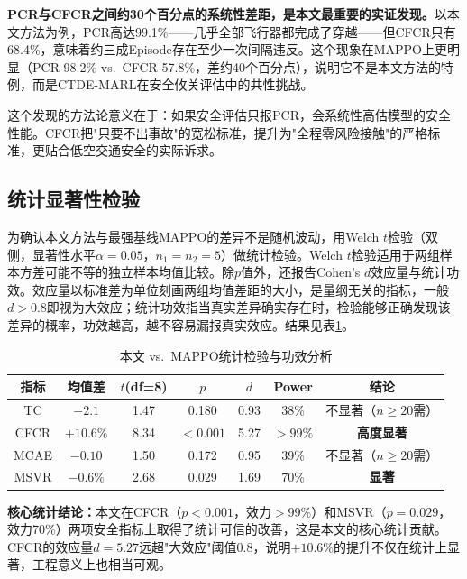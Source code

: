 \documentclass[12pt,a4paper,UTF8]{ctexart}
\begin{document}
\textbf{PCR与CFCR之间约30个百分点的系统性差距，是本文最重要的实证发现。}以本文方法为例，PCR高达99.1\%——几乎全部飞行器都完成了穿越——但CFCR只有68.4\%，意味着约三成Episode存在至少一次间隔违反。这个现象在MAPPO上更明显（PCR 98.2\% vs.\ CFCR 57.8\%，差约40个百分点），说明它不是本文方法的特例，而是CTDE-MARL在安全攸关评估中的共性挑战。

这个发现的方法论意义在于：如果安全评估只报PCR，会系统性高估模型的安全性能。CFCR把"只要不出事故"的宽松标准，提升为"全程零风险接触"的严格标准，更贴合低空交通安全的实际诉求。

\subsection{统计显著性检验}

为确认本文方法与最强基线MAPPO的差异不是随机波动，用Welch $t$检验\cite{ref42}（双侧，显著性水平$\alpha=0.05$，$n_1=n_2=5$）做统计检验。Welch $t$检验适用于两组样本方差可能不等的独立样本均值比较。除$p$值外，还报告Cohen's $d$效应量\cite{ref43}与统计功效。效应量以标准差为单位刻画两组均值差距的大小，是量纲无关的指标，一般$d>0.8$即视为大效应；统计功效指当真实差异确实存在时，检验能够正确发现该差异的概率，功效越高，越不容易漏报真实效应。结果见表\ref{tab:ttest}。

\begin{table}[H]
    \centering
    \caption{本文 vs.\ MAPPO统计检验与功效分析}
    \label{tab:ttest}
    \begin{tabular}{|c|c|c|c|c|c|c|}
        \hline
        \textbf{指标} & \textbf{均值差} & \textbf{$t$(df=8)} & \textbf{$p$} & \textbf{$d$} & \textbf{Power} & \textbf{结论} \\
        \hline
        TC & $-2.1$ & 1.47 & 0.180 & 0.93 & 38\% & 不显著（$n\geq20$需） \\
        CFCR & $+10.6\%$ & 8.34 & $<0.001$ & 5.27 & $>99\%$ & \textbf{高度显著} \\
        MCAE & $-0.10$ & 1.50 & 0.172 & 0.95 & 39\% & 不显著（$n\geq20$需） \\
        MSVR & $-0.6\%$ & 2.68 & 0.029 & 1.69 & 70\% & \textbf{显著} \\
        \hline
    \end{tabular}
\end{table}

\textbf{核心统计结论：}本文在CFCR（$p<0.001$，效力$>99\%$）和MSVR（$p=0.029$，效力70\%）两项安全指标上取得了统计可信的改善，这是本文的核心统计贡献。CFCR的效应量$d=5.27$远超"大效应"阈值0.8，说明$+10.6\%$的提升不仅在统计上显著，工程意义上也相当可观。
\end{document}
